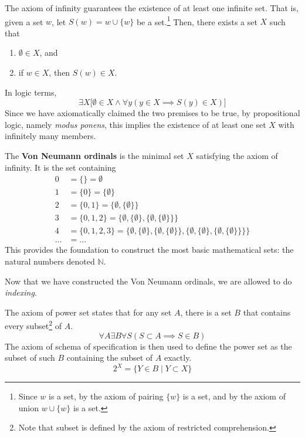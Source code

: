 \documentclass{article}
\begin{document}
    \begin{axiom}
      The axiom of infinity guarantees the existence of at least one infinite set. That is, given a set $w$, let $S(w) = w \cup \{w\}$ be a set.\footnote{Since $w$ is a set, by the axiom of pairing $\{w\}$ is a set, and by the axiom of union $w \cup \{w\}$ is a set.} Then, there exists a set $X$ such that 
      \begin{enumerate}
        \item $\emptyset \in X$, and 
        \item if $w \in X$, then $S(w) \in X$. 
      \end{enumerate} 
      In logic terms, 
      \begin{equation}
        \exists X \big[ \emptyset \in X \land \forall y (y \in X \implies S(y) \in X) \big]
      \end{equation}
      Since we have axiomatically claimed the two premises to be true, by propositional logic, namely \textit{modus ponens}, this implies the existence of at least one set $X$ with infinitely many members. 
    \end{axiom}

    \begin{definition} 
       The \textbf{Von Neumann ordinals} is the minimal set $X$ satisfying the axiom of infinity. It is the set containing 
      \begin{align*}
        0 & = \{\} = \emptyset \\
        1 & = \{0\} = \{\emptyset\} \\
        2 & = \{0,1\} = \{\emptyset,\{\emptyset\}\} \\
        3 & = \{0,1,2\} = \{\emptyset,\{\emptyset\},\{\emptyset,\{\emptyset\}\}\} \\
        4 & = \{0,1,2,3\} = \{\emptyset,\{\emptyset\},\{\emptyset,\{\emptyset\}\},\{\emptyset,\{\emptyset\},\{\emptyset,\{\emptyset\}\}\}\} \\
        \ldots & = \ldots 
      \end{align*} 
      This provides the foundation to construct the most basic mathematical sets: the natural numbers denoted $\mathbb{N}$.  
    \end{definition} 

    Now that we have constructed the Von Neumann ordinals, we are allowed to do \textit{indexing}. 

    \begin{axiom}
      The axiom of power set states that for any set $A$, there is a set $B$ that contains every subset\footnote{Note that subset is defined by the axiom of restricted comprehension.} of $A$. 
      \begin{equation}
        \forall A \exists B \forall S (S \subset A \implies S \in B)
      \end{equation}
      The axiom of schema of specification is then used to define the power set as the subset of such $B$ containing the subset of $A$ exactly. 
      \begin{equation}
        2^X = \{Y \in B \mid Y \subset X \}
      \end{equation}
    \end{axiom} 
\end{document}
